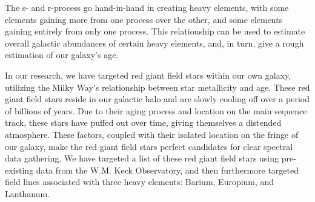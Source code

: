The s- and r-process go hand-in-hand in creating heavy elements, with some elements gaining more from one process over the other, and some elements gaining entirely from only one process. This relationship can be used to estimate overall galactic abundances of certain heavy elements, and, in turn, give a rough estimation of our galaxy's age.

In our research, we have targeted red giant field stars within our own galaxy, utilizing the Milky Way's relationship between star metallicity and age. These red giant field stars reside in our galactic halo and are slowly cooling off over a period of billions of years. Due to their aging process and location on the main sequence track, these stars have puffed out over time, giving themselves a distended atmosphere. These factors, coupled with their isolated location on the fringe of our galaxy, make the red giant field stars perfect candidates for clear spectral data gathering. We have targeted a list of these red giant field stars using pre-existing data from the W.M. Keck Observatory, and then furthermore targeted field lines associated with three heavy elements: Barium, Europium, and Lanthanum. 


